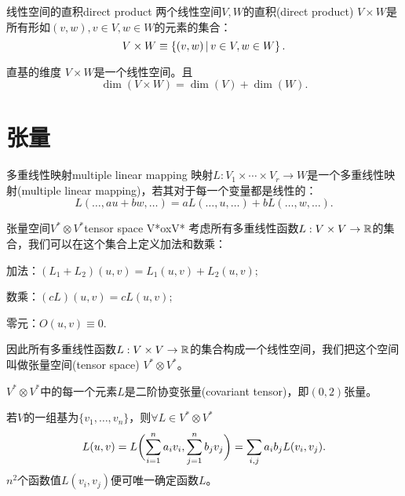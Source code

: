 \begin{definition}{线性空间的直积}{direct product}
	两个线性空间$V,W$的直积(direct product) $V\times W$是所有形如$(v,w),v\in V,w\in W$的元素的集合：
	\begin{equation}
		V\times W\equiv\left\{(v,w)\,\middle\vert\,v\in V,w\in W\right\}.
	\end{equation}
\end{definition}
\begin{theorem}{直基的维度}{}
	$V\times W$是一个线性空间。且
	\begin{equation}
		\dim(V\times W)=\dim(V)+\dim(W).
	\end{equation}
\end{theorem}
\section{张量}
\begin{definition}{多重线性映射}{multiple linear mapping}
	映射$L:V_1\times\cdots\times V_r\to W$是一个多重线性映射(multiple linear mapping)，若其对于每一个变量都是线性的：
	\[
		L(\ldots,au+bw,\ldots)=aL(\ldots,u,\ldots)+bL(\ldots,w,\ldots).
	\]
\end{definition}
\begin{definition}{张量空间$V^\ast\otimes V^\ast$}{tensor space V*oxV*}
	考虑所有多重线性函数$L:V\times V\to\mathbb R$的集合，我们可以在这个集合上定义加法和数乘：
	\begin{compactitem}
		\item 加法：$(L_1+L_2)(u,v)=L_1(u,v)+L_2(u,v);$
		\item 数乘：$(cL)(u,v)=cL(u,v);$
		\item 零元：$O(u,v)\equiv 0.$
	\end{compactitem}
	因此所有多重线性函数$L:V\times V\to\mathbb R$的集合构成一个线性空间，我们把这个空间叫做张量空间(tensor space) $V^\ast\otimes V^\ast$。

	$V^\ast\otimes V^\ast$中的每一个元素$L$是二阶协变张量(covariant tensor)，即$(0,2)$张量。
\end{definition}
若$V$的一组基为$\{v_1,\ldots,v_n\}$，则$\forall L\in V^\ast\otimes V^\ast$ 
\[
	L(u,v)=L\biggl(\sum_{i=1}^na_iv_i,\sum_{j=1}^nb_jv_j\biggr)=\sum_{i,j}a_ib_jL(v_i,v_j).
\]
$n^2$个函数值$L(v_i,v_j)$便可唯一确定函数$L$。

